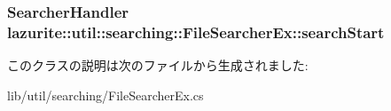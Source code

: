\label{classlazurite_1_1util_1_1searching_1_1_file_searcher_ex_a68148235f69ad9ff76a9bf3a6b1a9aab}
\hypertarget{classlazurite_1_1util_1_1searching_1_1_file_searcher_ex_a60a46ddddadd3eacfdc765e467c2583c}{
\subsubsection[{searchStart}]{\setlength{\rightskip}{0pt plus 5cm}SearcherHandler lazurite::util::searching::FileSearcherEx::searchStart}}
\label{classlazurite_1_1util_1_1searching_1_1_file_searcher_ex_a60a46ddddadd3eacfdc765e467c2583c}


このクラスの説明は次のファイルから生成されました:\begin{DoxyCompactItemize}
\item 
lib/util/searching/FileSearcherEx.cs\end{DoxyCompactItemize}
